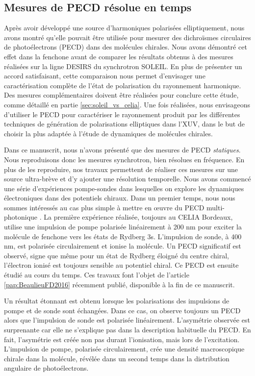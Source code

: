 \subsection{Mesures de PECD résolue en temps}
Après avoir développé une source d'harmoniques polarisées elliptiquement, nous avons montré qu'elle pouvait être utilisée pour mesurer des dichroïsmes circulaires de photoélectrons (PECD) dans des molécules chirales. Nous avons démontré cet effet dans la fenchone avant de comparer les résultats obtenus à des mesures réalisées sur la ligne DESIRS du synchrotron SOLEIL. En plus de présenter un accord satisfaisant, cette comparaison nous permet d'envisager une caractérisation complète de l'état de polarisation du rayonnement harmonique. Des mesures complémentaires doivent être réalisées pour conclure cette étude, comme détaillé en partie \ref{sec:soleil_vs_celia}. Une fois réalisées, nous envisageons d'utiliser le PECD pour caractériser le rayonnement produit par les différentes techniques de génération de polarisations elliptiques dans l'XUV, dans le but de choisir la plus adaptée à l'étude de dynamiques de molécules chirales.

Dans ce manuscrit, nous n'avons présenté que des mesures de PECD \textit{statiques}. Nous reproduisons donc les mesures synchrotron, bien résolues en fréquence. En plus de les reproduire, nos travaux permettent de réaliser ces mesures sur une source ultra-brève et d'y ajouter une résolution temporelle. Nous avons commencé une série d'expériences pompe-sondes dans lesquelles on explore les dynamiques électroniques dans des potentiels chiraux. Dans un premier temps, nous nous sommes intéressés au cas plus simple à mettre en œuvre du PECD multi-photonique . La première expérience réalisée, toujours au CELIA Bordeaux, utilise une impulsion de pompe polarisée linéairement à 200 nm pour exciter la molécule de fenchone vers les états de Rydberg 3s. L'impulsion de sonde, à 400 nm, est polarisée circulairement et ionise la molécule. Un PECD significatif est observé, signe que même pour un état de Rydberg éloigné du centre chiral, l'électron ionisé est toujours sensible au potentiel chiral. Ce PECD est ensuite étudié au cours du temps. Ces travaux font l'objet de l'article \ref{pap:BeaulieuFD2016} récemment publié, disponible à la fin de ce manuscrit.

Un résultat étonnant est obtenu lorsque les polarisations des impulsions de pompe et de sonde sont échangées. Dans ce cas, on observe toujours un PECD alors que l'impulsion de sonde est polarisée linéairement. L'asymétrie observée est surprenante car elle ne s'explique pas dans la description habituelle du PECD. En fait, l'asymétrie est créée non pas durant l'ionisation, mais lors de l'excitation. L'impulsion de pompe, polarisée circulairement, crée une densité macroscopique chirale dans la molécule, révélée dans un second temps dans la distribution angulaire de photoélectrons. 


